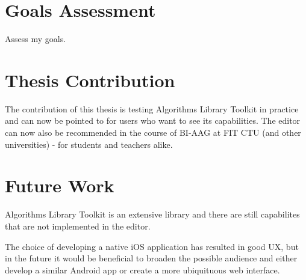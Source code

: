 \section{Goals Assessment}

Assess my goals.

\section{Thesis Contribution}

The contribution of this thesis is testing Algorithms Library Toolkit in practice and can now be pointed to for users who want to see its capabilities. The editor can now also be recommended in the course of BI-AAG at FIT CTU (and other universities) - for students and teachers alike.

\section{Future Work}

Algorithms Library Toolkit is an extensive library and there are still capabilites that are not implemented in the editor.

The choice of developing a native iOS application has resulted in good UX, but in the future it would be beneficial to broaden the possible audience and either develop a similar Android app or create a more ubiquituous web interface.
